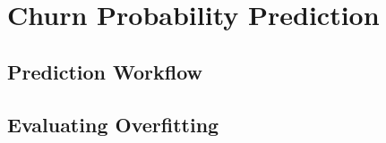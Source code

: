 \section{Churn Probability Prediction}
\label{sec:prediction}

\subsection{Prediction Workflow}

\subsection{Evaluating Overfitting}